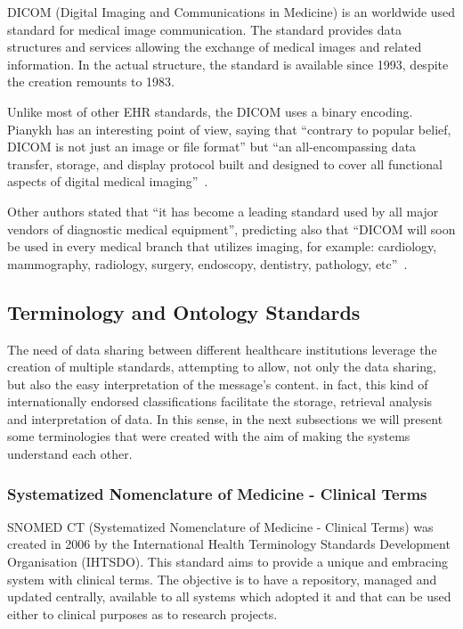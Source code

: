 DICOM (Digital Imaging and Communications in Medicine) is an worldwide used standard for medical image communication. The standard provides data structures and services allowing the exchange of medical images and related information. In the actual structure, the standard is available since 1993, despite the creation remounts to 1983.

Unlike most of other EHR standards, the DICOM uses a binary encoding. Pianykh has an interesting point of view, saying that ``contrary to popular belief, DICOM is not just an image or file format'' but ``an all-encompassing data transfer, storage, and display protocol built and designed to cover all functional aspects of digital medical imaging''~\citep{Pianykh2008}.

Other authors stated that ``it has become a leading standard used by all major vendors of diagnostic medical equipment'', predicting also that ``DICOM will soon be used in every medical branch that utilizes imaging, for example: cardiology, mammography, radiology, surgery, endoscopy, dentistry, pathology, etc''~\citep{Mustra2008}.


\subsection{Terminology and Ontology Standards}

The need of data sharing between different healthcare institutions leverage the creation of multiple standards, attempting to allow, not only the data sharing, but also the easy interpretation of the message's content. in fact, this kind of internationally endorsed classifications facilitate the storage, retrieval analysis and interpretation of data. In this sense, in the next subsections we will present some terminologies that were created with the aim of making the systems understand each other.

\subsubsection{Systematized Nomenclature of Medicine - Clinical Terms} \label{sec:snomed}

SNOMED CT (Systematized Nomenclature of Medicine - Clinical Terms) was created in 2006 by the International Health Terminology Standards Development Organisation (IHTSDO). This standard aims to provide a unique and embracing system with clinical terms. The objective is to have a repository, managed and updated centrally, available to all systems which adopted it and that can be used either to clinical purposes as to research projects.~\citep{ACSS/MS2009a}

